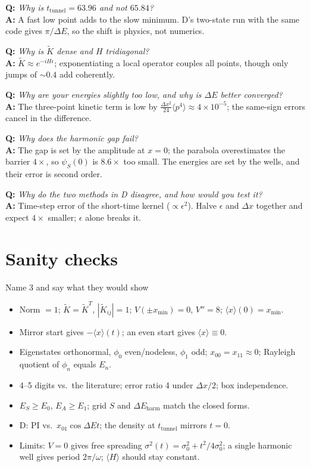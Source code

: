 \documentclass[10pt]{article}
\newcommand{\q}[1]{\textbf{Q:} \emph{#1}\\[1pt]}
\newcommand{\ans}{\textbf{A:} }
\begin{document}
\q{Why is $t_\text{tunnel}=63.96$ and not $65.84$?}\ans A fast low point adds to the slow minimum. D's two-state run with the same code gives $\pi/\Delta E$, so the shift is physics, not numerics.

\q{Why is $\tilde K$ dense and $H$ tridiagonal?}\ans $\tilde K\approx e^{-iH\epsilon}$; exponentiating a local operator couples all points, though only jumps of $\sim0.4$ add coherently.

\q{Why are your energies slightly too low, and why is $\Delta E$ better converged?}\ans The three-point kinetic term is low by $\frac{\Delta x^2}{24}\langle p^4\rangle\approx4\times10^{-5}$; the same-sign errors cancel in the difference.

\q{Why does the harmonic gap fail?}\ans The gap is set by the amplitude at $x=0$; the parabola overestimates the barrier $4\times$, so $\psi_S(0)$ is $8.6\times$ too small. The energies are set by the wells, and their error is second order.

\q{Why do the two methods in D disagree, and how would you test it?}\ans Time-step error of the short-time kernel ($\propto\epsilon^2$). Halve $\epsilon$ and $\Delta x$ together and expect $4\times$ smaller; $\epsilon$ alone breaks it.

\section{Sanity checks}
\begin{keybox}{Name 3 and say what they would show}
\begin{itemize}
\item Norm $=1$; $\tilde K=\tilde K^T$, $|\tilde K_{ij}|=1$; $V(\pm x_{\min})=0$, $V''=8$; $\langle x\rangle(0)=x_{\min}$.
\item Mirror start gives $-\langle x\rangle(t)$; an even start gives $\langle x\rangle\equiv0$.
\item Eigenstates orthonormal, $\phi_0$ even/nodeless, $\phi_1$ odd; $x_{00}=x_{11}\approx0$; Rayleigh quotient of $\phi_n$ equals $E_n$.
\item 4--5 digits vs.\ the literature; error ratio 4 under $\Delta x/2$; box independence.
\item $E_S\ge E_0$, $E_A\ge E_1$; grid $S$ and $\Delta E_\text{harm}$ match the closed forms.
\item D: PI vs.\ $x_{01}\cos\Delta Et$; the density at $t_\text{tunnel}$ mirrors $t=0$.
\item Limits: $V=0$ gives free spreading $\sigma^2(t)=\sigma_0^2+t^2/4\sigma_0^2$; a single harmonic well gives period $2\pi/\omega$; $\langle H\rangle$ should stay constant.
\end{itemize}
\end{keybox}
\end{document}
